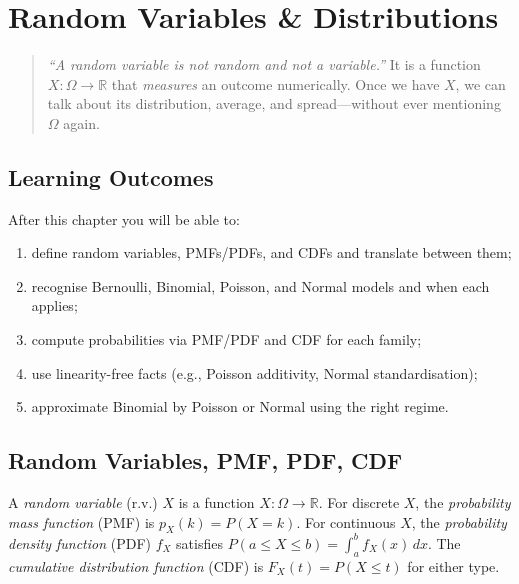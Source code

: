 \chapter{Random Variables \& Distributions}
\label{ch:distributions}

\begin{quote}
\emph{``A random variable is not random and not a variable.''} It is a function $X:\Omega\to\mathbb{R}$ that \emph{measures} an outcome numerically. Once we have $X$, we can talk about its distribution, average, and spread---without ever mentioning $\Omega$ again.
\end{quote}

\noindent{}
\vspace{0.4em}

\section*{Learning Outcomes}
After this chapter you will be able to:
\begin{enumerate}[label=(L\arabic*)]
    \item define random variables, PMFs/PDFs, and CDFs and translate between them;
    \item recognise Bernoulli, Binomial, Poisson, and Normal models and when each applies;
    \item compute probabilities via PMF/PDF and CDF for each family;
    \item use linearity-free facts (e.g., Poisson additivity, Normal standardisation);
    \item approximate Binomial by Poisson or Normal using the right regime.
\end{enumerate}

\section{Random Variables, PMF, PDF, CDF}
\label{sec:rv-def}

\begin{definition} A \emph{random variable} (r.v.) $X$ is a function $X:\Omega\to\mathbb{R}$. For discrete $X$, the \emph{probability mass function} (PMF) is $p_X(k)=P(X=k)$. For continuous $X$, the \emph{probability density function} (PDF) $f_X$ satisfies $P(a\le X\le b)=\int_a^b f_X(x)\,dx$. The \emph{cumulative distribution function} (CDF) is $F_X(t)=P(X\le t)$ for either type.
\end{definition}


